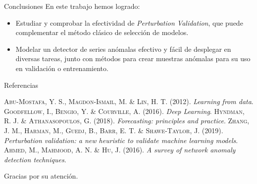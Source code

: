 \documentclass[spanish]{beamer}
\begin{document}
\begin{frame}{Conclusiones}
  En este trabajo hemos logrado:
  \pause
  \begin{itemize}[<+->]
    \item Estudiar y comprobar la efectividad de \emph{Perturbation Validation}, que puede complementar el método clásico de selección de modelos.
    \item Modelar un detector de series anómalas efectivo y fácil de desplegar en diversas tareas, junto con métodos para crear muestras anómalas para su uso en validación o entrenamiento.
  \end{itemize}
\end{frame}

\begin{frame}{Referencias}
  \begin{thebibliography}{9}
     \textsc{Abu-Mostafa, Y. S., Magdon-Ismail, M. \& Lin, H. T}. (2012). \textit{Learning from data}.
     \textsc{Goodfellow, I., Bengio, Y. \& Courville, A}. (2016). \textit{Deep Learning}.
     \textsc{Hyndman, R. J. \& Athanasopoulos, G}. (2018). \textit{Forecasting: principles and practice}.
     \textsc{Zhang, J. M., Harman, M., Guedj, B., Barr, E. T. \& Shawe-Taylor, J}. (2019). \textit{Perturbation validation: a new heuristic to validate machine learning models}.
     \textsc{Ahmed, M., Mahmood, A. N. \& Hu, J}. (2016). \textit{A survey of network anomaly detection techniques}.
  \end{thebibliography}
\end{frame}

\begin{frame}[standout]
  Gracias por su atención.
\end{frame}
\end{document}
